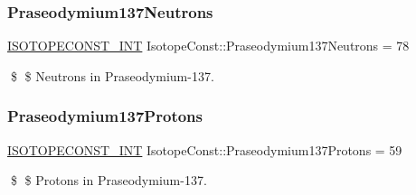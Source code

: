 \subsubsection{\texorpdfstring{Praseodymium137\+Neutrons}{Praseodymium137Neutrons}}
{\footnotesize\ttfamily \mbox{\hyperlink{group___isotope_const-_macros_ga5f18360b3e99483a35c32d789e62621c}{I\+S\+O\+T\+O\+P\+E\+C\+O\+N\+S\+T\+\_\+\+I\+NT}} Isotope\+Const\+::\+Praseodymium137\+Neutrons = 78}

\$ \$ Neutrons in Praseodymium-\/137. \mbox{\label{group___isotope_const-_praseodymium-_pr137_ga983023130a61cc6ea2b378a532abd34b}} 
\subsubsection{\texorpdfstring{Praseodymium137\+Protons}{Praseodymium137Protons}}
{\footnotesize\ttfamily \mbox{\hyperlink{group___isotope_const-_macros_ga5f18360b3e99483a35c32d789e62621c}{I\+S\+O\+T\+O\+P\+E\+C\+O\+N\+S\+T\+\_\+\+I\+NT}} Isotope\+Const\+::\+Praseodymium137\+Protons = 59}

\$ \$ Protons in Praseodymium-\/137. 